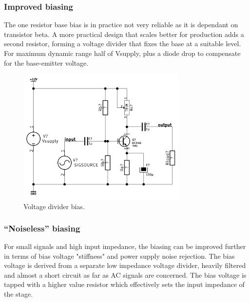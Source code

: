 \documentclass[11pt,a4paper]{article}
\begin{document}
\subsubsection{Improved biasing}\label{improved-biasing}
The one resistor base bias is in practice not very reliable as it is dependant
on transistor beta. A more practical design that scales better for production
adds a second resistor, forming a voltage divider that fixes the base at a
suitable level. For maximum dynamic range half of Vsupply, plus a diode drop to
compensate for the base-emitter voltage.

\begin{figure}[htbp]
    \centering
    \includegraphics[width=0.75\textwidth]{img/bjt-bias_2AC_improved.png}
    \caption{Voltage divider bias.}
    \label{fig:bjt-bias_2AC_improved}
\end{figure}

\subsubsection{``Noiseless'' biasing}\label{noiseless-biasing}
For small signals and high input impedance, the biasing can be improved further
in terms of bias voltage "stiffness" and power supply noise rejection. 
The bias voltage is derived from a separate low impedance voltage divider,
heavily filtered and almost a short circuit as far as AC signals are concerned.
The bias voltage is tapped with a higher value resistor which effectively sets
the input impedance of the stage.
\end{document}
